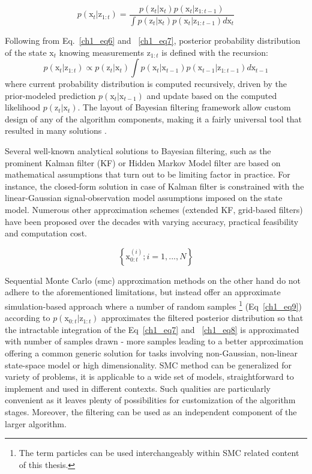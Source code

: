 \begin{equation}
p(\mathrm{x}_t | \mathrm{z}_{1:t}) = \frac{p(\mathrm{z}_t | \mathrm{x}_t) p(\mathrm{x}_t | \mathrm{z}_{1:t-1})}{ \int p(\mathrm{z}_t | \mathrm{x}_t) p(\mathrm{x}_t | \mathrm{z}_{1:t-1}) d\mathrm{x}_t}
\label{ch1_eq7}
\end{equation} 

Following from Eq.~\ref{ch1_eq6} and ~\ref{ch1_eq7}, posterior probability distribution of the state $\mathrm{x}_t$ knowing measurements $\mathrm{z}_{1:t}$ is defined with the recursion:  
\begin{equation}
p(\mathrm{x}_t | \mathrm{z}_{1:t}) \propto p(\mathrm{z}_t | \mathrm{x}_t) \int p(\mathrm{x}_t | \mathrm{x}_{t-1}) p(\mathrm{x}_{t-1} | \mathrm{z}_{1:t-1}) d\mathrm{x}_{t-1}
\label{ch1_eq8}
\end{equation}
where current probability distribution is computed recursively, driven by the prior-modeled prediction $p(\mathrm{x}_t | \mathrm{x}_{t-1})$ and update based on the computed likelihood $p(\mathrm{z}_t | \mathrm{x}_t)$. The layout of Bayesian filtering framework allow custom design of any of the algorithm components, making it a fairly universal tool that resulted in many solutions \cite{sarkka2013bayesian}.    

Several well-known analytical solutions to Bayesian filtering, such as the prominent Kalman filter (KF) or Hidden Markov Model filter are based on mathematical assumptions that turn out to be limiting factor in practice. For instance, the closed-form solution in case of Kalman filter is constrained  with the linear-Gaussian signal-observation model assumptions imposed on the state model. Numerous other approximation schemes (extended KF, grid-based filters) have been proposed over the decades with varying accuracy, practical feasibility and computation cost. 

\begin{equation}
\left\lbrace \mathrm{x}_{0:t}^{(i)}; i = 1, ... , N \right\rbrace 
\label{ch1_eq9}
\end{equation}

Sequential Monte Carlo (\gls{smc}) approximation methods \cite{arulampalam2002tutorial} on the other hand do not adhere to the aforementioned limitations, but instead offer an approximate simulation-based approach where a number of random samples \footnote{The term particles can be used interchangeably within SMC related content of this thesis.} (Eq~\ref{ch1_eq9}) according to $p(\mathrm{x}_{0:t} | \mathrm{z}_{1:t})$ approximates the filtered posterior distribution so that the intractable integration of the Eq~\ref{ch1_eq7} and ~\ref{ch1_eq8} is approximated with number of samples drawn - more samples leading to a better approximation offering a common generic solution for tasks involving non-Gaussian, non-linear state-space model or high dimensionality. SMC method can be generalized for variety of problems, it is applicable to a wide set of models, straightforward to implement and used in different contexts. Such qualities are particularly convenient as it leaves plenty of possibilities for customization of the algorithm stages. Moreover, the filtering can be used as an independent component of the larger algorithm. 

